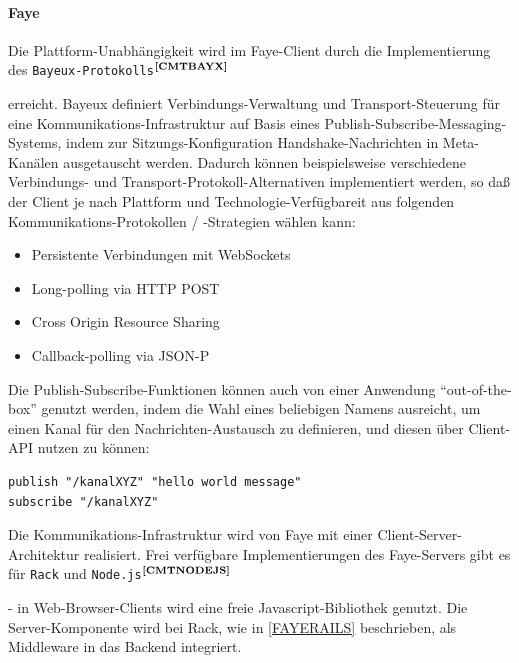 \paragraph{Faye}\label{Faye}
Die Plattform-Unabhängigkeit wird im Faye-Client durch die Implementierung des \texttt{Bayeux-Protokolls}$^{\textbf{\ref{CMTBAYX}}}$%
\addtocounter{footnote}{1}%
 erreicht. Bayeux definiert Verbindungs-Verwaltung und Transport-Steuerung für eine Kommunikations-Infrastruktur auf Basis eines Publish-Subscribe-Messaging-Systems, indem zur Sitzungs-Konfiguration Handshake-Nachrichten in Meta-Kanälen ausgetauscht werden. Dadurch können beispielsweise verschiedene Verbindungs- und Transport-Protokoll-Alternativen implementiert werden, so daß der Client je nach Plattform und Technologie-Verfügbareit aus folgenden Kommunikations-Protokollen / -Strategien wählen kann:
	\begin{itemize}
		\item Persistente Verbindungen mit WebSockets
		\item Long-polling via HTTP POST
		\item Cross Origin Resource Sharing
		\item Callback-polling via JSON-P
	\end{itemize}
Die Publish-Subscribe-Funktionen können auch von einer Anwendung "`out-of-the-box"' genutzt werden, indem die Wahl eines beliebigen Namens ausreicht, um einen Kanal für den Nachrichten-Austausch zu definieren, und diesen über Client-API nutzen zu können:
\lstset{language=JavaScript}
\begin{lstlisting}[frame=single,xleftmargin=0pt,numbers=none]
publish "/kanalXYZ" "hello world message"
subscribe "/kanalXYZ"
\end{lstlisting}
Die Kommunikations-Infrastruktur wird von Faye mit einer Client-Server-Architektur realisiert. Frei verfügbare Implementierungen des Faye-Servers gibt es für \texttt{Rack} und \texttt{Node.js}$^{\textbf{\ref{CMTNODEJS}}}$%
\addtocounter{footnote}{1}%
 - in Web-Browser-Clients wird eine freie Javascript-Bibliothek genutzt.
Die Server-Komponente wird bei Rack, wie in \ref{FAYERAILS} beschrieben, als Middleware in das Backend integriert.

